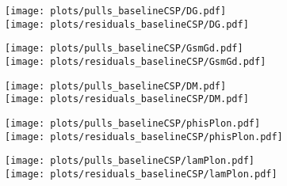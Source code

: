 \begin{subappendices}
\begin{figure}[H]
  \centering
  \begin{multicols}{2}
  \texttt{[image: plots/pulls\_baselineCSP/DG.pdf]}  \\
  \texttt{[image: plots/residuals\_baselineCSP/DG.pdf]}
  \end{multicols}  
  \begin{multicols}{2}
  \texttt{[image: plots/pulls\_baselineCSP/GsmGd.pdf]}  \\
  \texttt{[image: plots/residuals\_baselineCSP/GsmGd.pdf]}
  \end{multicols}  
  \begin{multicols}{2}
  \texttt{[image: plots/pulls\_baselineCSP/DM.pdf]}  \\
  \texttt{[image: plots/residuals\_baselineCSP/DM.pdf]}
  \end{multicols}  
  \begin{multicols}{2}
  \texttt{[image: plots/pulls\_baselineCSP/phisPlon.pdf]}  \\
  \texttt{[image: plots/residuals\_baselineCSP/phisPlon.pdf]}
  \end{multicols}  
  \begin{multicols}{2}
  \texttt{[image: plots/pulls\_baselineCSP/lamPlon.pdf]}  \\
  \texttt{[image: plots/residuals\_baselineCSP/lamPlon.pdf]}
  \end{multicols}    
\end{figure}


\end{subappendices}
